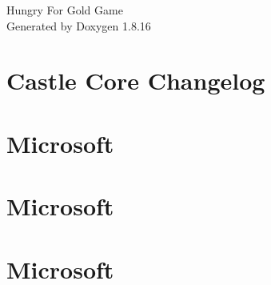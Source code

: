 \let\mypdfximage\pdfximage\def\pdfximage{\immediate\mypdfximage}\documentclass[twoside]{book}
\newcommand{\+}{\discretionary{\mbox{\scriptsize$\hookleftarrow$}}{}{}}
\newcommand{\clearemptydoublepage}{%
  \newpage{\pagestyle{empty}\cleardoublepage}%
}
\begin{document}
\hypersetup{pageanchor=false,
             bookmarksnumbered=true,
             pdfencoding=unicode
            }
\begin{titlepage}
\vspace*{7cm}
\begin{center}%
{\Large Hungry For Gold Game }\\
\vspace*{1cm}
{\large Generated by Doxygen 1.8.16}\\
\end{center}
\end{titlepage}
\clearemptydoublepage
{}
\tableofcontents
\clearemptydoublepage
{}
\hypersetup{pageanchor=true}

\chapter{Castle Core Changelog}
\label{md_packages__castle_8_core_84_84_80__c_h_a_n_g_e_l_o_g}

\chapter{Microsoft}
\label{md_packages__microsoft_8_code_analysis_8_fx_cop_analyzers_82_89_83_documentation__microsoft_8_code_analysis_8_fx_cop_analyzers}

\chapter{Microsoft}
\label{md_packages__microsoft_8_code_analysis_8_version_check_analyzer_82_89_83_documentation__microsof1638aec2febd61febd21b1b0d3709101}

\chapter{Microsoft}
\label{md_packages__microsoft_8_code_quality_8_analyzers_82_89_83_documentation__microsoft_8_code_quality_8_analyzers}

\end{document}
